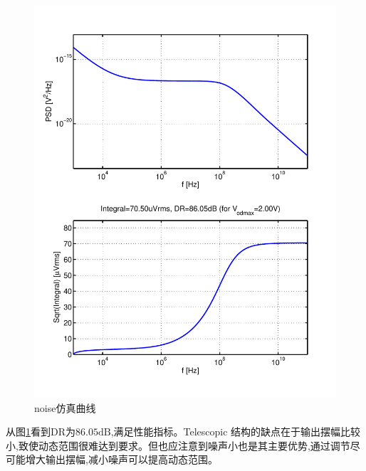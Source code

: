 \documentclass[a4paper]{article}
\newcommand{\udB}{\si{\deci\bel}}
\begin{document}
\begin{figure}[htb]
    \begin{center}
        \includegraphics[width=\textwidth]{common/noise.pdf}
    \end{center}
    \caption{noise仿真曲线}
    \label{commonnoise}
\end{figure}
从图\ref{commonnoise}看到DR为$86.05\udB$,满足性能指标。Telescopic 结构的缺点在于输出摆幅比较小,致使动态范围很难达到要求。但也应注意到噪声小也是其主要优势,通过调节尽可能增大输出摆幅,减小噪声可以提高动态范围。
\newpage
\end{document}
